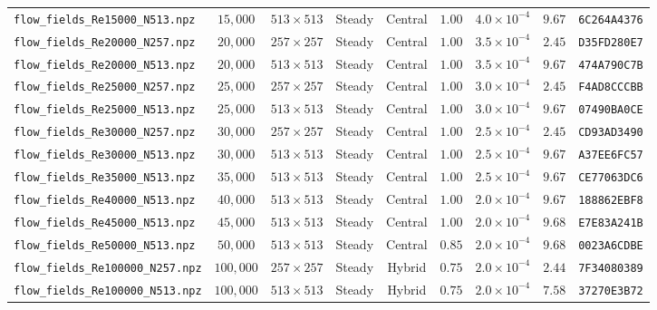 \documentclass[11pt,a4paper]{article}
\begin{document}
\begin{table}[htbp]
{\begin{tabular}{lcccccccl}
\texttt{flow\_fields\_Re15000\_N513.npz}   & $15,000$  & $513 \times 513$   & Steady & Central & $1.00$ & $4.0 \times 10^{-4}$ & $9.67$  & \texttt{6C264A4376} \\
\texttt{flow\_fields\_Re20000\_N257.npz}   & $20,000$  & $257 \times 257$   & Steady & Central & $1.00$ & $3.5 \times 10^{-4}$ & $2.45$  & \texttt{D35FD280E7} \\
\texttt{flow\_fields\_Re20000\_N513.npz}   & $20,000$  & $513 \times 513$   & Steady & Central & $1.00$ & $3.5 \times 10^{-4}$ & $9.67$  & \texttt{474A790C7B} \\
\texttt{flow\_fields\_Re25000\_N257.npz}   & $25,000$  & $257 \times 257$   & Steady & Central & $1.00$ & $3.0 \times 10^{-4}$ & $2.45$  & \texttt{F4AD8CCCBB} \\
\texttt{flow\_fields\_Re25000\_N513.npz}   & $25,000$  & $513 \times 513$   & Steady & Central & $1.00$ & $3.0 \times 10^{-4}$ & $9.67$  & \texttt{07490BA0CE} \\
\texttt{flow\_fields\_Re30000\_N257.npz}   & $30,000$  & $257 \times 257$   & Steady & Central & $1.00$ & $2.5 \times 10^{-4}$ & $2.45$  & \texttt{CD93AD3490} \\
\texttt{flow\_fields\_Re30000\_N513.npz}   & $30,000$  & $513 \times 513$   & Steady & Central & $1.00$ & $2.5 \times 10^{-4}$ & $9.67$  & \texttt{A37EE6FC57} \\
\texttt{flow\_fields\_Re35000\_N513.npz}   & $35,000$  & $513 \times 513$   & Steady & Central & $1.00$ & $2.5 \times 10^{-4}$ & $9.67$  & \texttt{CE77063DC6} \\
\texttt{flow\_fields\_Re40000\_N513.npz}   & $40,000$  & $513 \times 513$   & Steady & Central & $1.00$ & $2.0 \times 10^{-4}$ & $9.67$  & \texttt{188862EBF8} \\
\texttt{flow\_fields\_Re45000\_N513.npz}   & $45,000$  & $513 \times 513$   & Steady & Central & $1.00$ & $2.0 \times 10^{-4}$ & $9.68$  & \texttt{E7E83A241B} \\
\texttt{flow\_fields\_Re50000\_N513.npz}   & $50,000$  & $513 \times 513$   & Steady & Central & $0.85$ & $2.0 \times 10^{-4}$ & $9.68$  & \texttt{0023A6CDBE} \\
\texttt{flow\_fields\_Re100000\_N257.npz}  & $100,000$ & $257 \times 257$   & Steady & Hybrid  & $0.75$ & $2.0 \times 10^{-4}$ & $2.44$  & \texttt{7F34080389} \\
\texttt{flow\_fields\_Re100000\_N513.npz}  & $100,000$ & $513 \times 513$   & Steady & Hybrid  & $0.75$ & $2.0 \times 10^{-4}$ & $7.58$  & \texttt{37270E3B72} \\

\end{tabular}}
\end{table}
\end{document}
